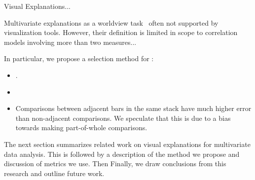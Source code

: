 
Visual Explanations...

Multivariate explanations as a worldview task~\cite{Amar2004} often not supported by visualization tools. However, their definition is limited in scope to correlation models involving more than two measures...

In particular, we propose a selection method for :
\begin{itemize}
    \item .
    \item     \item Comparisons between adjacent bars in the same stack have much higher error than non-adjacent comparisons. We speculate that this is due to a bias towards making part-of-whole comparisons. 
\end{itemize}

The next section summarizes related work on visual explanations for multivariate data analysis. This is followed by a description of the method we propose and discussion of metrics we use. Then Finally, we draw conclusions from this research and outline future work.
